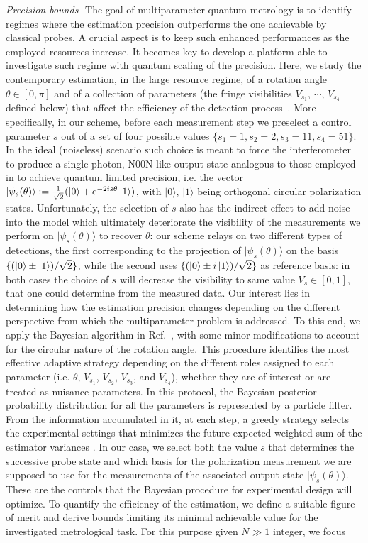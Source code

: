 \documentclass[aps,pra,twocolumn,notitlepage,superscriptaddress]{revtex4-1}
\begin{document}
\emph{Precision bounds-}
%
The goal of multiparameter quantum metrology is to identify regimes where the estimation precision outperforms the one achievable by classical probes. A crucial aspect is to keep such enhanced performances as the employed resources increase. It becomes key to develop a platform able to investigate such regime with quantum scaling of the precision. Here, we study the contemporary estimation, in the large resource regime, of a rotation angle $\theta\in [0,\pi]$ and of a collection of parameters (the fringe visibilities $V_{s_1}$, $\cdots$, $V_{s_4}$ defined below) that affect the efficiency of the detection process~\cite{dambrosio_gear2013}. More specifically, in our scheme, before each measurement step we preselect a control parameter $s$ out of a set of four possible values $\{s_1=1,s_2=2,s_3=11,s_4=51\}$. In the ideal (noiseless) scenario such choice is meant to force the interferometer to produce a single-photon, N00N-like output state analogous to those employed in \cite{higgins2007entanglement} to achieve quantum limited precision, i.e. the vector $|\psi_s(\theta)\rangle:=\frac{1}{\sqrt{2}} (\ket{0}+e^{-2is\theta}\ket{1})$, with $|0\rangle$, $|1\rangle$ being orthogonal circular polarization states. Unfortunately, the selection of $s$ also has the indirect effect to add noise into the model which ultimately deteriorate the visibility of the measurements we perform on $|\psi_s(\theta)\rangle$ to recover $\theta$: our scheme relays on two different types of detections, the first corresponding to the projection of $|\psi_s(\theta)\rangle$ on the basis $\{ (\ket{0}\pm \ket{1})/\sqrt{2}\}$, while the second uses $\{ (\ket{0}\pm i \ket{1})/\sqrt{2}\}$ as reference basis: in both cases the choice of $s$ will decrease the visibility to same value $V_s\in[0,1]$, that one could determine from the measured data. Our interest lies in determining how the estimation precision changes depending on the different perspective from which the multiparameter problem is addressed. To this end, we apply the Bayesian algorithm in Ref.~\cite{granade2012robust}, with some minor modifications to account for the circular nature of the rotation angle. This procedure identifies the most effective adaptive strategy depending on the different roles assigned to each parameter (i.e. $\theta$, $V_{s_1}$, $V_{s_2}$, $V_{s_3}$, and $V_{s_4}$), whether they are of interest or are treated as nuisance parameters. In this protocol, the Bayesian posterior probability distribution for all the parameters is represented by a particle filter. From the information accumulated in it, at each step, a greedy strategy selects the experimental settings that minimizes the future expected weighted sum of the estimator variances \cite{granade2012robust}. In our case, we select both the value $s$ that determines the successive probe state and which basis for the polarization measurement we are supposed to use for the measurements of the associated output state $|\psi_s(\theta)\rangle$. These are the controls that the Bayesian procedure for experimental design will optimize. To quantify the efficiency of the estimation, we define a suitable figure of merit and derive bounds limiting its minimal achievable value for the investigated metrological task. For this purpose given $N\gg 1$ integer, we focus 
\end{document}

